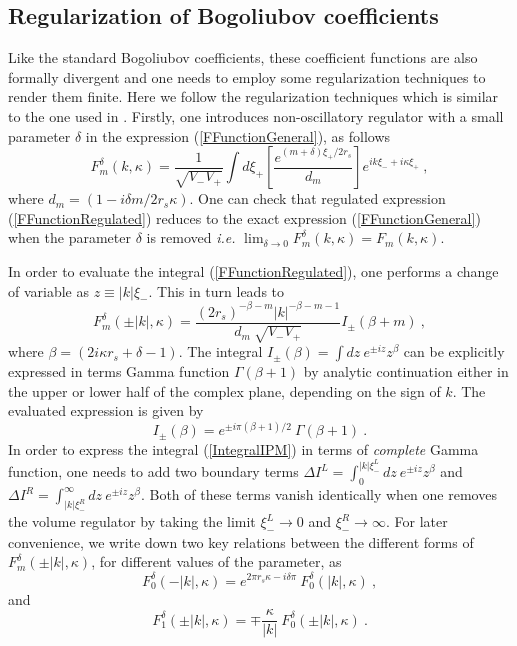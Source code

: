 \documentclass[aps,12pt,showpacs]{revtex4-2}
\def\kr{\kappa}
\def\rs{r_s}
\begin{document}
\subsection{Regularization of Bogoliubov coefficients}

Like the standard Bogoliubov coefficients, these coefficient functions are 
also formally divergent and one needs to employ some regularization techniques 
to render them finite. Here we follow the regularization techniques which is 
similar to the one used in \cite{Hossain:2014fma}. Firstly, one introduces 
non-oscillatory regulator with a small parameter $\delta$ in the expression 
(\ref{FFunctionGeneral}), as follows
%
\begin{equation}\label{FFunctionRegulated}
F_{m}^{\delta}(k,\kr) = \frac{1}{\sqrt{V_{-} V_{+}}} 
\int d\xi_{+} \left[\frac{e^{(m+\delta)\xi_{+}/2 \rs}}{d_m} \right]
e^{i k \xi_{-} + i \kr \xi_{+}}  ~,
\end{equation}
%
where $d_m = (1 - i\delta m/2\rs\kr)$. One can check that regulated expression 
(\ref{FFunctionRegulated}) reduces to the exact expression 
(\ref{FFunctionGeneral}) when the parameter $\delta$ is removed
\emph{i.e.} $\lim_{\delta\to0} F_{m}^{\delta}(k,\kr) = F_{m}(k,\kr)$.


In order to evaluate the integral (\ref{FFunctionRegulated}), one performs a
change of variable as $z \equiv |k| \xi_{-}$. This in turn leads to 
%
\begin{equation}\label{FFunctionEvaluated}
F_{m}^{\delta}(\pm|k|,\kr) = \frac{(2\rs)^{-\beta-m} |k|^{-\beta-m-1} }
{d_m ~\sqrt{V_{-} V_{+}}} I_{\pm}(\beta+m) ~,
\end{equation}
%
where $\beta = (2i\kr\rs + \delta - 1)$. The integral $I_{\pm}(\beta) = \int dz 
~e^{\pm i z} z^{\beta}$ can be explicitly expressed in terms Gamma function 
$\Gamma(\beta+1)$ by analytic continuation either in the upper or lower half of 
the complex plane, depending on the sign of $k$. The evaluated expression is 
given by
%
\begin{equation}\label{IntegralIPM}
I_{\pm}(\beta) = e^{\pm i \pi(\beta+1)/2} ~\Gamma(\beta+1)  ~.
\end{equation}
%
In order to express the integral (\ref{IntegralIPM}) in terms of \emph{complete}
Gamma function, one needs to add two boundary terms 
$\Delta I^{L} = \int_0^{|k|\xi_{-}^L} dz ~e^{\pm i z} z^{\beta}$ and 
$\Delta I^{R} = \int_{|k|\xi_{-}^R}^{\infty} dz ~e^{\pm i z} z^{\beta}$. Both 
of these terms vanish identically when one removes the volume regulator by 
taking the limit $\xi_{-}^L\to0$ and $\xi_{-}^R\to\infty$. 
%
For later convenience, we write down two key relations between the different 
forms of $F_{m}^{\delta}(\pm|k|,\kr)$, for different values of the parameter, as
%
\begin{equation}\label{F0F0Relation}
F_{0}^{\delta}(-|k|,\kr) = e^{2\pi\rs\kr - i\delta\pi}~F_{0}^{\delta}(|k|,\kr) 
~,
\end{equation}
%
and 
%
\begin{equation}\label{F0F1Relation}
F_{1}^{\delta}(\pm|k|,\kr) = \mp \frac{\kr}{|k|}~F_{0}^{\delta}(\pm|k|,\kr) ~.
\end{equation}
%
\end{document}
